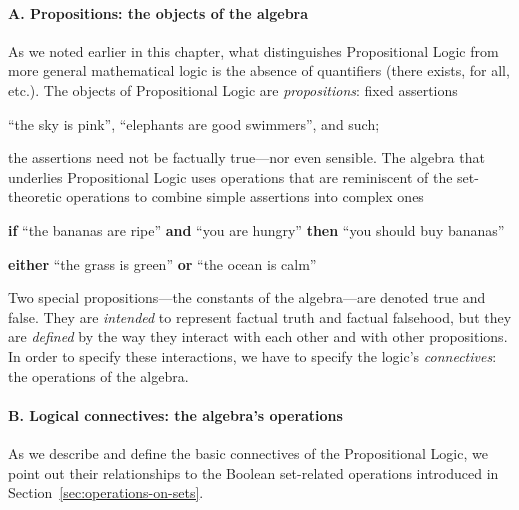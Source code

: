 \paragraph{A. Propositions: the objects of the algebra}

\noindent
As we noted earlier in this chapter, what distinguishes Propositional Logic from more general mathematical logic is the absence of quantifiers ({\sc there exists}, {\sc for all}, etc.).  The objects of Propositional Logic are {\it propositions}: fixed assertions

\smallskip

``the sky is pink'', ``elephants are good swimmers'', and such;

\smallskip

\noindent 
the assertions need not be factually true---nor even sensible.  The algebra that underlies Propositional Logic uses operations that are reminiscent of the set-theoretic operations to combine simple assertions into complex ones

\smallskip

{\bf if} ``the bananas are ripe'' {\bf and} ``you are hungry'' {\bf then} ``you should buy bananas''

\smallskip

{\bf either} ``the grass is green'' {\bf or} ``the ocean is calm''

\smallskip

\noindent
Two special propositions---the constants of the algebra---are denoted {\sc true} and {\sc false}.  They are {\em intended} to represent factual truth and factual falsehood, but they are {\em defined} by the way they interact with each other and with other propositions.  In order
to specify these interactions, we have to specify the logic's {\it connectives}: the operations of the algebra.

\bigskip

\paragraph{B. Logical connectives: the algebra's operations}

\noindent
As we describe and define the basic connectives of the Propositional Logic, we point out their relationships to the Boolean set-related operations introduced in Section~\ref{sec:operations-on-sets}.

